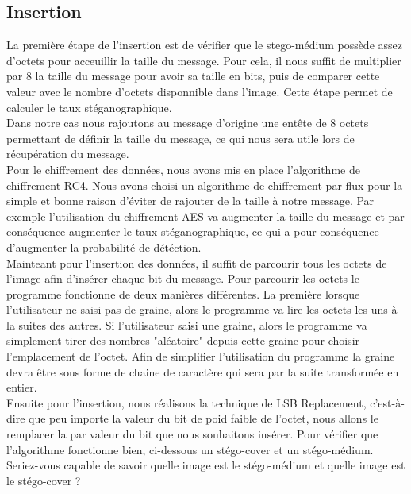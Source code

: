 \documentclass[letterpaper,12pt, french]{article}
\begin{document}
\clearpage

\subsection{Insertion}
\label{sec:orgb8f4237}

La première étape de l'insertion est de vérifier que le stego-médium possède assez d'octets pour acceuillir la taille du
message. Pour cela, il nous suffit de multiplier par 8 la taille du message pour avoir sa taille en bits, puis de comparer cette valeur avec le nombre d'octets disponnible dans l'image. Cette étape permet de calculer le taux stéganographique.
\vspace{1\baselineskip}
\\
Dans notre cas nous rajoutons au message d'origine une entête de 8 octets permettant de définir la taille du message, 
ce qui nous sera utile lors de récupération du message.
\vspace{1\baselineskip}
\\
Pour le chiffrement des données, nous avons mis en place l'algorithme de chiffrement RC4. Nous avons choisi un algorithme
de chiffrement par flux pour la simple et bonne raison d'éviter de rajouter de la taille à notre message. Par exemple
l'utilisation du chiffrement AES va augmenter la taille du message et par conséquence augmenter le taux stéganographique, ce qui a pour conséquence d'augmenter la probabilité de détéction.
\vspace{1\baselineskip}
\\
Mainteant pour l'insertion des données, il suffit de parcourir tous les octets de l'image afin d'insérer chaque bit du message. Pour parcourir les octets le programme fonctionne de deux manières différentes. La première lorsque l'utilisateur ne saisi pas de graine, alors le programme va lire les octets les uns à la suites des autres. Si l'utilisateur saisi une graine, alors le programme va simplement tirer des nombres "aléatoire" depuis cette graine pour choisir l'emplacement de l'octet. Afin de simplifier l'utilisation  du programme la graine devra être sous forme de chaine de caractère qui sera par la suite transformée en entier.
\vspace{1\baselineskip}
\\
Ensuite pour l'insertion, nous réalisons la technique de LSB Replacement, c'est-à-dire que peu importe la valeur du bit de poid faible de l'octet, nous allons le remplacer la par valeur du bit que nous souhaitons insérer.
\clearpage
Pour vérifier que l'algorithme fonctionne bien, ci-dessous un stégo-cover et un stégo-médium. Seriez-vous capable de savoir quelle image est le stégo-médium et quelle image est le stégo-cover ? 
\end{document}
